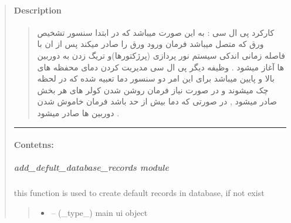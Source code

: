 \documentclass[letterpaper,10pt,english]{sphinxmanual}
\begin{document}
\begin{quote}
\paragraph{Description}
\label{\detokenize{setting/backend Dir:description}}\begin{quote}\begin{farsi}

\sphinxAtStartPar
کارکرد پی ال سی : به این صورت میباشد که در ابتدا سنسور تشخیص ورق که متصل میباشد فرمان ورود ورق را صادر میکند پس از ان با فاصله زمانی اندکی سیستم نور پردازی (پرژکتورها)و تریگ زدن به دوربین ها آغاز میشود . وظیفه دیگر پی ال سی مدیریت کردن دمای محفظه های بالا و پایین میباشد برای این امر دو سنسور دما تعبیه شده که در لحظه چک میشوند و در صورت نیاز فرمان روشن شدن کولر های هر بخش صادر میشود , در صورتی که دما بیش از حد باشد فرمان خاموش شدن دوربین ها صادر میشود .
\end{farsi}\end{quote}


\bigskip\hrule\bigskip



\paragraph{Contetns:}
\label{\detokenize{setting/backend Dir:contetns}}
\sphinxstepscope


\subparagraph{add\_defult\_database\_records module}
\label{\detokenize{setting/backend/add_default_database_records:module-oxin.backend.add_default_database_records}}\label{\detokenize{setting/backend/add_default_database_records:add-defult-database-records-module}}\label{\detokenize{setting/backend/add_default_database_records::doc}}

\begin{savenotes}\begin{fulllineitems}
\label{\detokenize{setting/backend/add_default_database_records:oxin.backend.add_default_database_records.create_default_records}}
\pysigstartsignatures
{}
\pysigstopsignatures
\sphinxAtStartPar
this function is used to create default records in database, if not exist
\begin{quote}\begin{description}
\begin{itemize}
\item {} 
\sphinxAtStartPar
{} – (\_type\_) main ui object


\end{itemize}
\end{description}
\end{quote}
\end{fulllineitems}
\end{savenotes}
\end{quote}
\end{document}
